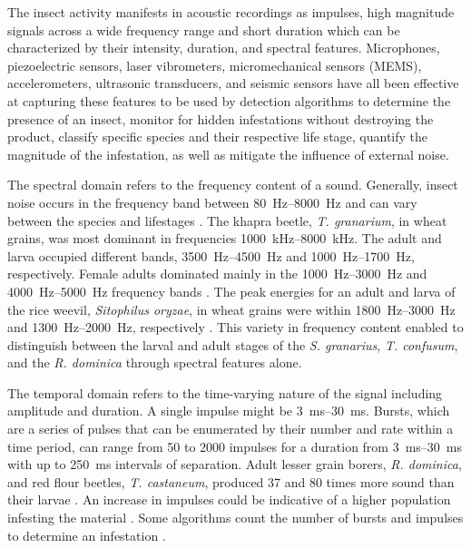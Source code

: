 The insect activity manifests in acoustic recordings as impulses, high magnitude signals across a wide frequency range and short duration which can be characterized by their intensity, duration, and spectral features. Microphones, piezoelectric sensors, laser vibrometers, micromechanical sensors (MEMS), accelerometers, ultrasonic transducers, and seismic sensors have all been effective at capturing these features to be used by detection algorithms to determine the presence of an insect, monitor for hidden infestations without destroying the product, classify specific species and their respective life stage, quantify the magnitude of the infestation, as well as mitigate the influence of external noise.

The spectral domain refers to the frequency content of a sound. Generally, insect noise occurs in the frequency band between \SIrange{80}{8000}{\hertz} \cite{mankinPerspectivePromiseCentury2011} and can vary between the species and lifestages \cite{azizifarsaniBioacousticsTrogodermaGranarium2023,fleurat-lessardAcousticDetectionAutomatic2006}. The khapra beetle, \textit{T. granarium}, in wheat grains, was most dominant in frequencies \SIrange{1000}{8000}{\kilo\hertz}. The adult and larva occupied different bands, \SIrange{3500}{4500}{\hertz} and \SIrange{1000}{1700}{\hertz}, respectively. Female adults dominated mainly in the \SIrange{1000}{3000}{\hertz} and \SIrange{4000}{5000}{\hertz} frequency bands \cite{azizifarsaniBioacousticsTrogodermaGranarium2023}. The peak energies for an adult and larva of the rice weevil, \textit{Sitophilus oryzae}, in wheat grains were within \SIrange{1800}{3000}{\hertz} and \SIrange{1300}{2000}{\hertz}, respectively \cite{fleurat-lessardAcousticDetectionAutomatic2006}. This variety in frequency content enabled \citeauthor{schwabAutomaticAcousticalSurveillance2005} to distinguish between the larval and adult stages of the \textit{S. granarius}, \textit{T. confusum}, and the \textit{R. dominica} through spectral features alone.

The temporal domain refers to the time-varying nature of the signal including amplitude and duration. A single impulse might be \SIrange{3}{30}{\milli\second}. Bursts, which are a series of pulses that can be enumerated by their number and rate within a time period, can range from 50 to 2000 impulses for a duration from \SIrange{3}{30}{\milli\second} with up to \SI{250}{\milli\second} intervals of separation. Adult lesser grain borers, \textit{R. dominica}, and red flour beetles, \textit{T. castaneum}, produced 37 and 80 times more sound than their larvae \cite{mankinPerspectivePromiseCentury2011}. An increase in impulses could be indicative of a higher population infesting the material \cite{hagstrumAutomatedAcousticalMonitoring1991}. Some algorithms count the number of bursts and impulses to determine an infestation \cite{mankinAcousticIndicatorsTargeted2010,mankinPerspectivePromiseCentury2011, njorogeAcousticPitfallTrap2019, mankinAutomatedApplicationsAcoustics2021}.

